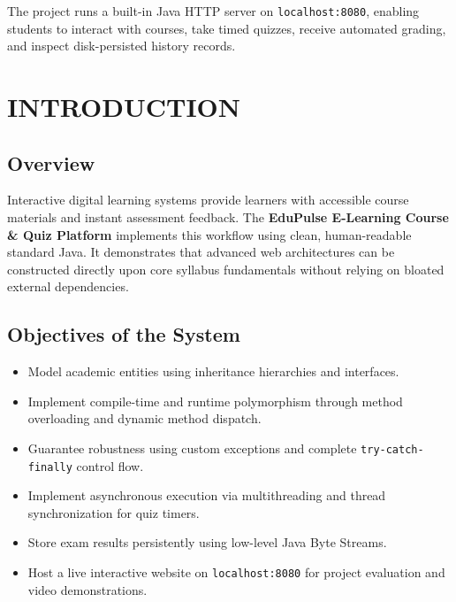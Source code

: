 \documentclass[12pt,a4paper]{article}
\begin{document}
\vspace{0.5cm}
\noindent The project runs a built-in Java HTTP server on \texttt{localhost:8080}, enabling students to interact with courses, take timed quizzes, receive automated grading, and inspect disk-persisted history records.

\newpage

\tableofcontents
\newpage

\setcounter{page}{6}

\section{INTRODUCTION}

\subsection{Overview}
Interactive digital learning systems provide learners with accessible course materials and instant assessment feedback. The \textbf{EduPulse E-Learning Course \& Quiz Platform} implements this workflow using clean, human-readable standard Java. It demonstrates that advanced web architectures can be constructed directly upon core syllabus fundamentals without relying on bloated external dependencies.

\subsection{Objectives of the System}
\begin{itemize}
    \item Model academic entities using inheritance hierarchies and interfaces.
    \item Implement compile-time and runtime polymorphism through method overloading and dynamic method dispatch.
    \item Guarantee robustness using custom exceptions and complete \texttt{try-catch-finally} control flow.
    \item Implement asynchronous execution via multithreading and thread synchronization for quiz timers.
    \item Store exam results persistently using low-level Java Byte Streams.
    \item Host a live interactive website on \texttt{localhost:8080} for project evaluation and video demonstrations.
\end{itemize}
\end{document}
